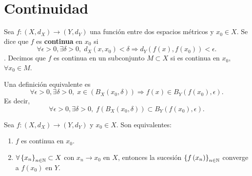 \chapter{Continuidad}
\begin{definition}[Continuidad]
Sea $\displaystyle f : \left(X,d _{X}\right) \to \left(Y, d _{Y}\right) $ una función entre dos espacios métricos y $\displaystyle x_{0} \in X $. Se dice que $\displaystyle f $ es \textbf{continua} en $\displaystyle x_{0} $ si 
\[\forall \epsilon > 0, \exists \delta > 0, \; d _{X}\left(x,x_{0}\right) < \delta \Rightarrow d _{Y}\left(f\left(x\right), f\left(x_{0}\right)\right) < \epsilon .\]
. Decimos que $\displaystyle f $ es continua en un subconjunto $\displaystyle M \subset X $ si es continua en $\displaystyle x_{0} $, $\displaystyle \forall x_{0} \in M $.
\end{definition}
\begin{observation}
Una definición equivalente es
\[\forall \epsilon > 0, \exists \delta > 0, \; x \in \left(B_{X}\left(x_{0}, \delta \right)\right) \Rightarrow f\left(x\right) \in B _{Y}\left(f\left(x_{0}\right), \epsilon \right) .\]
Es decir, 
\[\forall \epsilon > 0, \exists \delta > 0, \; f\left(B_{X}\left(x_{0}, \delta \right)\right) \subset B_{Y}\left(f\left(x_{0}\right), \epsilon \right) .\]
\end{observation}
\begin{prop}
Sea $\displaystyle f : \left(X, d _{X}\right) \to \left(Y, d _{Y}\right) $ y $\displaystyle x_{0} \in X $. Son equivalentes:
\begin{enumerate}
\item $\displaystyle f $ es continua en $\displaystyle x_{0} $.
\item $\displaystyle \forall \left\{ x_{n}\right\} _{n\in\mathbb{N}}\subset X $ con $\displaystyle x_{n} \to x_{0} $ en $\displaystyle X $, entonces la sucesión $\displaystyle \left\{ f\left(x_{n}\right)\right\} _{n\in\mathbb{N}} $ converge a $\displaystyle f\left(x_{0}\right) $ en $\displaystyle Y $.
\end{enumerate}
\end{prop}
